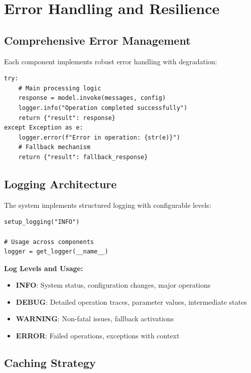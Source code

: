 \documentclass[11pt,a4paper]{report}
\begin{document}
\section{Error Handling and Resilience}

\subsection{Comprehensive Error Management}

Each component implements robust error handling with degradation:

\begin{lstlisting}[caption={Error handling pattern}]
try:
    # Main processing logic
    response = model.invoke(messages, config)
    logger.info("Operation completed successfully")
    return {"result": response}
except Exception as e:
    logger.error(f"Error in operation: {str(e)}")
    # Fallback mechanism
    return {"result": fallback_response}
\end{lstlisting}

\subsection{Logging Architecture}

The system implements structured logging with configurable levels:

\begin{lstlisting}[caption={Logging implementation}]
setup_logging("INFO")

# Usage across components
logger = get_logger(__name__)
\end{lstlisting}

\textbf{Log Levels and Usage:}
\begin{itemize}
    \item \textbf{INFO}: System status, configuration changes, major operations
    \item \textbf{DEBUG}: Detailed operation traces, parameter values, intermediate states
    \item \textbf{WARNING}: Non-fatal issues, fallback activations
    \item \textbf{ERROR}: Failed operations, exceptions with context
\end{itemize}

\subsection{Caching Strategy}
\end{document}
